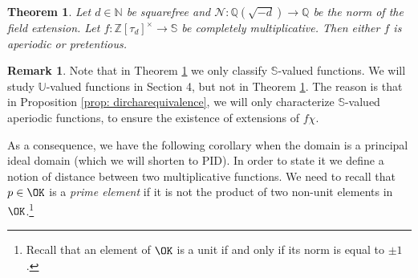 \documentclass[11pt]{amsart}
\newtheorem{theorem}[lemma]{Theorem}
\theoremstyle{definition}
\newtheorem*{remark}{Remark}
\newcommand{\D}{{\mathbb D}}
\newcommand{\N}{{\mathbb N}}
\newcommand{\NN}{{\mathcal N}}
\newcommand{\Q}{{\mathbb Q}}
\newcommand{\R}{{\mathbb R}}
\renewcommand{\S}{\mathbb{S}}
\newcommand{\Z}{{\mathbb Z}}
\newcommand{\U}{{\mathbb U}}
\begin{document}
\begin{theorem}\label{characterization}
     Let  $d\in\N$ be squarefree and $\NN\colon \Q(\sqrt{-d})\to \Q$ be the norm of the field extension. Let $f\colon \Z[\tau_{d}]^{\times}\to\S$ be completely multiplicative. Then either $f$ is aperiodic or  pretentious. %
\end{theorem}



\begin{remark}
Note that in Theorem \ref{characterization} we only classify $\S$-valued functions. We will study $\U$-valued functions in Section 4, but not in Theorem \ref{characterization}. The reason is that in Proposition \ref{prop: dircharequivalence}, we will only characterize $\S$-valued aperiodic functions, to ensure the existence of extensions of $f\chi$.
\end{remark}



As a consequence, we have the following corollary when the domain is a principal ideal domain (which we will shorten to PID). In order to state it we define a notion of distance between two multiplicative functions. We need to recall that $p \in \OK$ is a \emph{prime element} if it is not the product of two non-unit elements in $\OK$.\footnote{Recall that an element of $\OK$ is a unit if and only if its norm is equal to $\pm 1$.}
\end{document}
